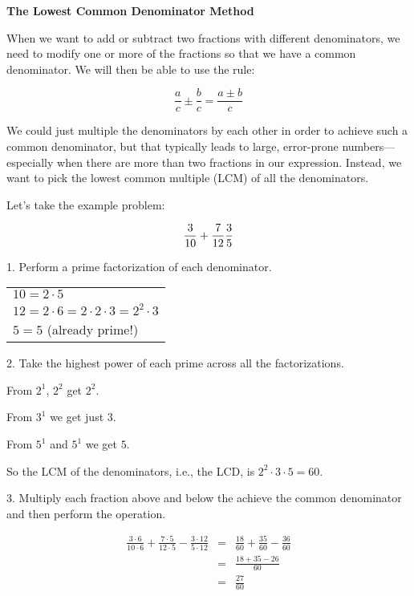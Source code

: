 \documentclass[letterpaper]{article}
\begin{document}
\begin{center}
\textbf{The Lowest Common Denominator Method}
\end{center}

\bigskip

When we want to add or subtract two fractions with different denominators, we
need to modify one or more of the fractions so that we have a common
denominator.  We will then be able to use the rule:

\[\frac{a}{c}\pm\frac{b}{c}=\frac{a\pm b}{c} \]

We could just multiple the denominators by each other in order to achieve such
a common denominator, but that typically leads to large, error-prone numbers---
especially when there are more than two fractions in our expression. Instead,
we want to pick the lowest common multiple (LCM) of all the denominators.

Let's take the example problem:

\[\frac{3}{10}+\frac{7}{12}\-\frac{3}{5}\]

1. Perform a prime factorization of each denominator.

\bigskip

\begin{tabular}{l}
$10=2\cdot5$ \\
$12=2\cdot6=2\cdot2\cdot3=2^2\cdot3$ \\
$5=5$ (already prime!) \\
\end{tabular}

\bigskip

2. Take the highest power of each prime across all the factorizations.

\bigskip

From $2^1$, $2^2$ get $2^2$.

From $3^1$ we get just $3$.

From $5^1$ and $5^1$ we get $5$.

\bigskip

So the LCM of the denominators, i.e., the LCD, is $2^2\cdot3\cdot5=60$.

\bigskip

3. Multiply each fraction above and below the achieve the common denominator
and then perform the operation.

\begin{eqnarray*}
\frac{3\cdot6}{10\cdot6}+\frac{7\cdot5}{12\cdot5}-
    \frac{3\cdot12}{5\cdot12} &=&
    \frac{18}{60}+\frac{35}{60}-\frac{36}{60} \\
&=& \frac{18+35-26}{60} \\
&=& \frac{27}{60} \\
\end{eqnarray*}
\end{document}
